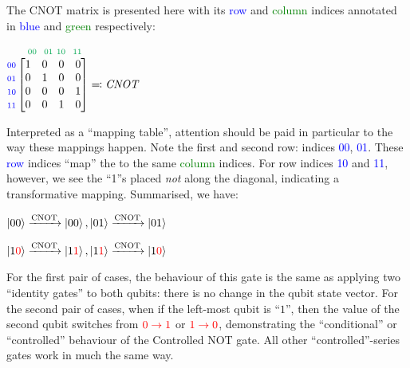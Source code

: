 \documentclass[conference]{IEEEtran}
\begin{document}
The CNOT matrix is presented here with its \textcolor{blue}{row} and \textcolor{Green}{column}
indices annotated in \textcolor{blue}{blue} and \textcolor{Green}{green} respectively:


\begin{center}
$
\begin{matrix}
    \ \ \ {\scriptstyle\textcolor{Green}{00}} \ \ {\scriptstyle\textcolor{Green}{01}} \ {\scriptstyle\textcolor{Green}{10}} \ \ {\scriptstyle\textcolor{Green}{11}} \ \ \ \ \ \ \ \ \ \ \ \ \
    \\
    \begin{matrix}
    {\scriptstyle\textcolor{blue}{00}} \\
    {\scriptstyle\textcolor{blue}{01}} \\
    {\scriptstyle\textcolor{blue}{10}} \\
    {\scriptstyle\textcolor{blue}{11}}
    \end{matrix}
    \begin{bmatrix}
    1 & 0 & 0 & 0 \\
    0 & 1 & 0 & 0 \\
    0 & 0 & 0 & 1 \\
    0 & 0 & 1 & 0
    \end{bmatrix}
    \eqcolon \text{\textit{CNOT}}
\end{matrix}
$
\end{center}

Interpreted as a ``mapping table'', attention should be paid in particular to the way these mappings happen.
Note the first and second row: indices \textcolor{blue}{00}, \textcolor{blue}{01}. These \textcolor{blue}{row} indices ``map'' the
to the same \textcolor{Green}{column} indices. For row indices \textcolor{blue}{10} and \textcolor{blue}{11}, however, we see the ``1''s
placed \textit{not} along the diagonal, indicating a transformative mapping. Summarised, we have:
\begin{center}
$
\ket{00} \xrightarrow{\text{CNOT}} \ket{00},
\ket{01} \xrightarrow{\text{CNOT}} \ket{01}
$
\end{center}
\begin{center}
$
\ket{1\textcolor{red}{0}} \xrightarrow{\text{CNOT}} \ket{1\textcolor{red}{1}},
\ket{1\textcolor{red}{1}} \xrightarrow{\text{CNOT}} \ket{1\textcolor{red}{0}}
$
\end{center}

For the first pair of cases, the behaviour of this gate is the same as applying two ``identity gates''
to both qubits: there is no change in the qubit state vector. For the second pair of cases,
when if the left-most qubit is ``$1$'', then the value of the second qubit switches from $\textcolor{red}{0 \rightarrow 1}$ or $\textcolor{red}{1 \rightarrow 0}$,
demonstrating the ``conditional'' or ``controlled'' behaviour of the Controlled NOT gate.
All other ``controlled''-series gates work in much the same way.
\end{document}

